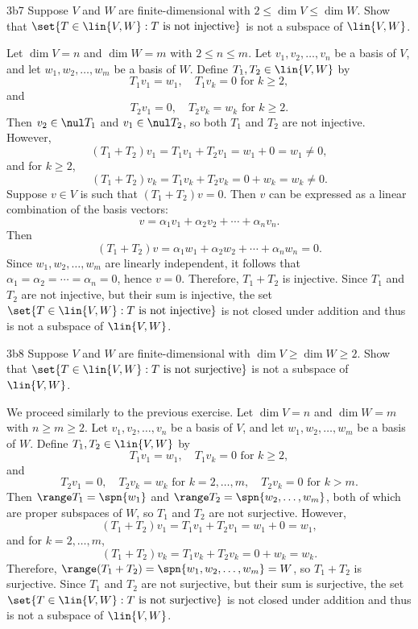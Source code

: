 \begin{exercise}{3b7}
    Suppose $V$ and $W$ are finite-dimensional with $2 \leq \dim V \leq \dim W$.
	Show that $\set{T \in \lin{V, W} : T \text{ is not injective}}$ is not a subspace of $\lin{V, W}$.
\end{exercise}

\begin{sol}
    Let $\dim V = n$ and $\dim W = m$ with $2 \leq n \leq m$.
	Let $v_1, v_2, \ldots, v_n$ be a basis of $V$, and let $w_1, w_2, \ldots, w_m$ be a basis of $W$.
	Define $T_1, T_2 \in \lin{V, W}$ by
    \[
    	T_1 v_1 = w_1, \quad T_1 v_k = 0 \text{ for } k \geq 2,
    \]
    and
    \[
    	T_2 v_1 = 0, \quad T_2 v_k = w_k \text{ for } k \geq 2.
    \]
    Then $v_2 \in \nul T_1$ and $v_1 \in \nul T_2$, so both $T_1$ and $T_2$ are not injective.
	However,
    \[
    	(T_1 + T_2)v_1 = T_1 v_1 + T_2 v_1 = w_1 + 0 = w_1 \neq 0,
    \]
    and for $k \geq 2$,
    \[
    	(T_1 + T_2)v_k = T_1 v_k + T_2 v_k = 0 + w_k = w_k \neq 0.
    \]
    Suppose $v \in V$ is such that $(T_1 + T_2)v = 0$.
	Then $v$ can be expressed as a linear combination of the basis vectors:
    \[
    	v = \alpha_1 v_1 + \alpha_2 v_2 + \cdots + \alpha_n v_n.
    \]
    Then
    \[
    	(T_1 + T_2)v = \alpha_1 w_1 + \alpha_2 w_2 + \cdots + \alpha_n w_n = 0.
    \]
    Since $w_1, w_2, \ldots, w_m$ are linearly independent, it follows that $\alpha_1 = \alpha_2 = \cdots = \alpha_n = 0$, hence $v = 0$.
	Therefore, $T_1 + T_2$ is injective.
	Since $T_1$ and $T_2$ are not injective, but their sum is injective, the set $\set{T \in \lin{V, W} : T \text{ is not injective}}$ is not closed under addition and thus is not a subspace of $\lin{V, W}$.
\end{sol}

\begin{exercise}{3b8}
    Suppose $V$ and $W$ are finite-dimensional with $\dim V \geq \dim W \geq 2$.
	Show that $\set{T \in \lin{V, W} : T \text{ is not surjective}}$ is not a subspace of $\lin{V, W}$.
\end{exercise}

\begin{sol}
    We proceed similarly to the previous exercise.
	Let $\dim V = n$ and $\dim W = m$ with $n \geq m \geq 2$.
	Let $v_1, v_2, \ldots, v_n$ be a basis of $V$, and let $w_1, w_2, \ldots, w_m$ be a basis of $W$.
	Define $T_1, T_2 \in \lin{V, W}$ by
    \[
    	T_1 v_1 = w_1, \quad T_1 v_k = 0 \text{ for } k \geq 2,
    \]
    and
    \[
    	T_2 v_1 = 0, \quad T_2 v_k = w_k \text{ for } k = 2, \ldots, m, \quad T_2 v_k = 0 \text{ for } k > m.
    \]
    Then $\range T_1 = \spn{w_1}$ and $\range T_2 = \spn{w_2, \ldots, w_m}$, both of which are proper subspaces of $W$, so $T_1$ and $T_2$ are not surjective.
	However,
    \[
    	(T_1 + T_2)v_1 = T_1 v_1 + T_2 v_1 = w_1 + 0 = w_1,
    \]
    and for $k = 2, \ldots, m$,
    \[
    	(T_1 + T_2)v_k = T_1 v_k + T_2 v_k = 0 + w_k = w_k.
    \]
    Therefore, $\range(T_1 + T_2) = \spn{w_1, w_2, \ldots, w_m} = W$, so $T_1 + T_2$ is surjective.
	Since $T_1$ and $T_2$ are not surjective, but their sum is surjective, the set $\set{T \in \lin{V, W} : T \text{ is not surjective}}$ is not closed under addition and thus is not a subspace of $\lin{V, W}$.
\end{sol}

